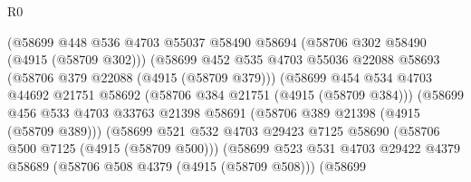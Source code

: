 \begin{lexlean}{R0}
\begin{coremodule}
                                    (@58699
                                      @448
                                      @536
                                      @4703
                                      @55037
                                      @58490
                                      @58694
                                      (@58706 @302 @58490 (@4915 (@58709 @302)))
                                      (@58699
                                        @452
                                        @535
                                        @4703
                                        @55036
                                        @22088
                                        @58693
                                        (@58706 @379 @22088 (@4915 (@58709 @379)))
                                        (@58699
                                          @454
                                          @534
                                          @4703
                                          @44692
                                          @21751
                                          @58692
                                          (@58706 @384 @21751 (@4915 (@58709 @384)))
                                          (@58699
                                            @456
                                            @533
                                            @4703
                                            @33763
                                            @21398
                                            @58691
                                            (@58706 @389 @21398 (@4915 (@58709 @389)))
                                            (@58699
                                              @521
                                              @532
                                              @4703
                                              @29423
                                              @7125
                                              @58690
                                              (@58706 @500 @7125 (@4915 (@58709 @500)))
                                              (@58699
                                                @523
                                                @531
                                                @4703
                                                @29422
                                                @4379
                                                @58689
                                                (@58706 @508 @4379 (@4915 (@58709 @508)))
                                                (@58699

\end{coremodule}
\end{lexlean}
